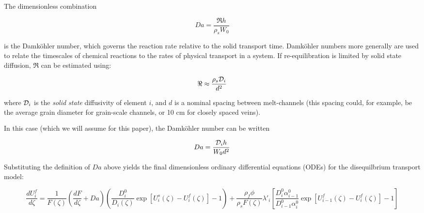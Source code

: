 \documentclass[draft]{agujournal2019}
\begin{document}
The dimensionless combination

\begin{linenomath*}
\begin{equation}
    Da = \frac{\Re h}{\rho_s W_0}\label{eq:50}
\end{equation}
\end{linenomath*}

is the Damk\"{o}hler number, which governs the reaction rate relative to the solid transport time. Damk\"{o}hler numbers more generally are used to relate the timescales of chemical reactions to the rates of physical transport in a system. If re-equilibration is limited by solid state diffusion, $\Re$ can be estimated using:

\begin{linenomath*}
\begin{equation}
    \Re \approx \frac{\rho_s{\cal D}_i}{d^2}\label{eq:51}
\end{equation}
\end{linenomath*}

where ${\cal D}_i$ is the \textit{solid state} diffusivity of element $i$, and $d$ is a nominal spacing between melt-channels (this spacing could, for example, be the average grain diameter for grain-scale channels, or 10 cm for closely spaced veins). 

In this case (which we will assume for this paper),  the Damk\"{o}hler number can be written

\begin{linenomath*}
\begin{equation}
    Da = \frac{{\cal D}_i h}{W_0 d^2}\label{eq:52}
\end{equation}
\end{linenomath*}

Substituting the definition of $Da$ above yields the final dimensionless ordinary differential equations (ODEs) for the disequilbrium transport model:

\begin{linenomath*}
\begin{equation}
    \frac{dU_i^f}{d\zeta} = \frac{1}{F(\zeta)}\left(\frac{dF}{d\zeta} + Da\right)\left(\frac{D_i^0}{D_i(\zeta)}\exp[U_i^s(\zeta) - U_i^f(\zeta)] - 1\right) + \frac{\rho_f \phi}{\rho_s F(\zeta)}\lambda'_i \left[\frac{D_i^0 \alpha_{i-1}^0}{D_{i-1}^0 \alpha_i^0} \exp[U_{i-1}^f(\zeta) - U_i^f(\zeta)]-1\right]\label{eq:53}
\end{equation}
\end{linenomath*}
\end{document}
